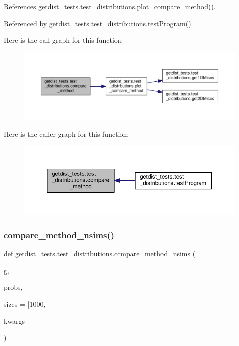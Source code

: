 References getdist\+\_\+tests.\+test\+\_\+distributions.\+plot\+\_\+compare\+\_\+method().



Referenced by getdist\+\_\+tests.\+test\+\_\+distributions.\+test\+Program().

Here is the call graph for this function\+:
\nopagebreak
\begin{figure}[H]
\begin{center}
\leavevmode
\includegraphics[width=350pt]{namespacegetdist__tests_1_1test__distributions_a6af1d23a030f9dc1de91037323596e1a_cgraph}
\end{center}
\end{figure}
Here is the caller graph for this function\+:
\nopagebreak
\begin{figure}[H]
\begin{center}
\leavevmode
\includegraphics[width=350pt]{namespacegetdist__tests_1_1test__distributions_a6af1d23a030f9dc1de91037323596e1a_icgraph}
\end{center}
\end{figure}
\mbox{\label{namespacegetdist__tests_1_1test__distributions_a8a3af891fac318ff66848b94c79a8a17}} 
\subsubsection{\texorpdfstring{compare\+\_\+method\+\_\+nsims()}{compare\_method\_nsims()}}
{\footnotesize\ttfamily def getdist\+\_\+tests.\+test\+\_\+distributions.\+compare\+\_\+method\+\_\+nsims (\begin{DoxyParamCaption}\item[{}]{g,  }\item[{}]{probs,  }\item[{}]{sizes = {\ttfamily \mbox{[}1000},  }\item[{}]{kwargs }\end{DoxyParamCaption})}



